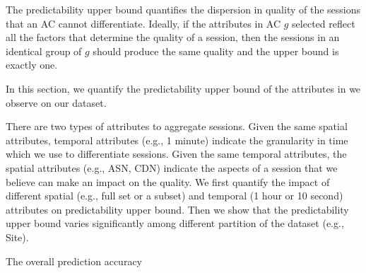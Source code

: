 The predictability upper bound quantifies the dispersion in quality of the sessions that an AC cannot differentiate. Ideally, if the attributes in AC $g$ selected reflect all the factors that determine the quality of a session, then the sessions in an identical group of $g$ should produce the same quality and the upper bound is exactly one. 


In this section, we quantify the predictability upper bound of the attributes in we observe on our dataset. 


There are two types of attributes to aggregate sessions. Given the same spatial attributes, temporal attributes (e.g., 1 minute) indicate the granularity in time which we use to differentiate sessions. Given the same temporal attributes, the spatial attributes (e.g., ASN, CDN) indicate the aspects of a session that we believe can make an impact on the quality.
We first quantify the impact of different spatial (e.g., full set or a subset) and temporal (1 hour or 10 second) attributes on predictability upper bound. Then we show that the predictability upper bound varies significantly among different partition of the dataset (e.g., Site).





\begin{packedenumerate}
	\item The overall prediction accuracy
\end{packedenumerate}



